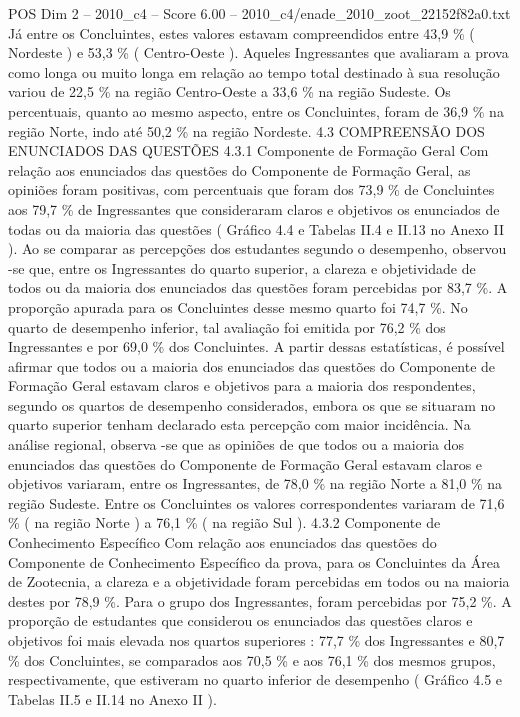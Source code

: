\begin{textsample}{POS Dim 2 – 2010\_c4 – Score 6.00 – 2010\_c4/enade\_2010\_zoot\_22152f82a0.txt}
Já entre os Concluintes, estes valores estavam compreendidos entre 43,9 \% ( Nordeste ) e 53,3 \% ( Centro-Oeste ).
Aqueles Ingressantes que avaliaram a prova como longa ou muito longa em relação ao tempo total destinado à sua resolução variou de 22,5 \% na região Centro-Oeste a 33,6 \% na região Sudeste.
Os percentuais, quanto ao mesmo aspecto, entre os Concluintes, foram de 36,9 \% na região Norte, indo até 50,2 \% na região Nordeste. 4.3 COMPREENSÃO DOS ENUNCIADOS DAS QUESTÕES 4.3.1 Componente de Formação Geral Com relação aos enunciados das questões do Componente de Formação Geral, as opiniões foram positivas, com percentuais que foram dos 73,9 \% de Concluintes aos 79,7 \% de Ingressantes que consideraram claros e objetivos os enunciados de todas ou da maioria das questões ( Gráfico 4.4 e Tabelas II.4 e II.13 no Anexo II ).
Ao se comparar as percepções dos estudantes segundo o desempenho, observou -se que, entre os Ingressantes do quarto superior, a clareza e objetividade de todos ou da maioria dos enunciados das questões foram percebidas por 83,7 \%.
A proporção apurada para os Concluintes desse mesmo quarto foi 74,7 \%.
No quarto de desempenho inferior, tal avaliação foi emitida por 76,2 \% dos Ingressantes e por 69,0 \% dos Concluintes.
A partir dessas estatísticas, é possível afirmar que todos ou a maioria dos enunciados das questões do Componente de Formação Geral estavam claros e objetivos para a maioria dos respondentes, segundo os quartos de desempenho considerados, embora os que se situaram no quarto superior tenham declarado esta percepção com maior incidência.
Na análise regional, observa -se que as opiniões de que todos ou a maioria dos enunciados das questões do Componente de Formação Geral estavam claros e objetivos variaram, entre os Ingressantes, de 78,0 \% na região Norte a 81,0 \% na região Sudeste.
Entre os Concluintes os valores correspondentes variaram de 71,6 \% ( na região Norte ) a 76,1 \% ( na região Sul ). 4.3.2 Componente de Conhecimento Específico Com relação aos enunciados das questões do Componente de Conhecimento Específico da prova, para os Concluintes da Área de Zootecnia, a clareza e a objetividade foram percebidas em todos ou na maioria destes por 78,9 \%.
Para o grupo dos Ingressantes, foram percebidas por 75,2 \%.
A proporção de estudantes que considerou os enunciados das questões claros e objetivos foi mais elevada nos quartos superiores : 77,7 \% dos Ingressantes e 80,7 \% dos Concluintes, se comparados aos 70,5 \% e aos 76,1 \% dos mesmos grupos, respectivamente, que estiveram no quarto inferior de desempenho ( Gráfico 4.5 e Tabelas II.5 e II.14 no Anexo II ).

\end{textsample}
